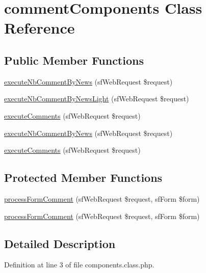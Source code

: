 \hypertarget{classcomment_components}{\section{comment\-Components Class Reference}
\label{classcomment_components}
}
\subsection*{Public Member Functions}
\begin{DoxyCompactItemize}
\item 
\hyperlink{classcomment_components_aa0d4bd8f52f78a4a6e70c795679e0eb6}{execute\-Nb\-Comment\-By\-News} (sf\-Web\-Request \$request)
\item 
\hyperlink{classcomment_components_a75f4d267fe2fee623229b7c97b14a246}{execute\-Nb\-Comment\-By\-News\-Light} (sf\-Web\-Request \$request)
\item 
\hyperlink{classcomment_components_a62fda782931a54a0024eca338d6df280}{execute\-Comments} (sf\-Web\-Request \$request)
\item 
\hyperlink{classcomment_components_aa0d4bd8f52f78a4a6e70c795679e0eb6}{execute\-Nb\-Comment\-By\-News} (sf\-Web\-Request \$request)
\item 
\hyperlink{classcomment_components_a62fda782931a54a0024eca338d6df280}{execute\-Comments} (sf\-Web\-Request \$request)
\end{DoxyCompactItemize}
\subsection*{Protected Member Functions}
\begin{DoxyCompactItemize}
\item 
\hyperlink{classcomment_components_aef3ac892333674db7f6147d1d4be5faa}{process\-Form\-Comment} (sf\-Web\-Request \$request, sf\-Form \$form)
\item 
\hyperlink{classcomment_components_aef3ac892333674db7f6147d1d4be5faa}{process\-Form\-Comment} (sf\-Web\-Request \$request, sf\-Form \$form)
\end{DoxyCompactItemize}


\subsection{Detailed Description}


Definition at line 3 of file components.\-class.\-php.



